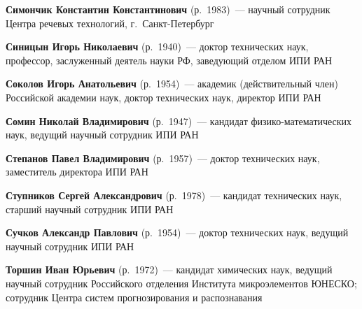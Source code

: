 \begin{multicols}{2}
\vspace*{4pt}

\def\leftfootline{\small{\textbf{\thepage}
\hfill ИНФОРМАТИКА И ЕЁ ПРИМЕНЕНИЯ\ \ \ том~6\ \ \ выпуск~1\ \ \ 2012}
}%
 \def\rightfootline{\small{ИНФОРМАТИКА И ЕЁ ПРИМЕНЕНИЯ\ \ \ том~6\ \ \ выпуск~1\ \ \ 2012
\hfill \textbf{\thepage}}}

\noindent
\textbf{Симончик Константин Константинович} (р.\ 1983)~--- 
научный сотрудник Центра речевых технологий, г.~Санкт-Пе\-тер\-бург

\vspace*{4pt}

\noindent
\textbf{Синицын Игорь Николаевич} (р.\ 1940)~--- доктор технических наук, 
профессор, заслуженный деятель науки РФ, заведующий отделом ИПИ РАН

\vspace*{4pt}


\noindent 
\textbf{Соколов Игорь Анатольевич} (р.\ 1954)~---
академик (действительный член) Российской академии наук,
доктор технических наук, директор ИПИ РАН

\vspace*{4pt}

\noindent
\textbf{Сомин Николай Владимирович} (р.\ 1947)~--- 
кандидат физико-математических наук, ведущий научный сотрудник ИПИ РАН

\vspace*{4pt}

\noindent
\textbf{Степанов Павел Владимирович} (р.\ 1957)~--- 
доктор технических наук, заместитель директора ИПИ РАН
\columnbreak


\noindent
\textbf{Ступников  Сергей Александрович}  (р.\ 1978)~--- 
кандидат технических  наук, старший научный сотрудник ИПИ РАН

\vspace*{6pt}

\noindent
\textbf{Сучков Александр Павлович} (р.\ 1954)~--- 
доктор технических наук, ведущий научный сотрудник ИПИ РАН


\vspace*{6pt}

\noindent
\textbf{Торшин Иван Юрьевич} (р.\ 1972)~--- кандидат химических наук, ведущий научный сотрудник 
Российского отделения Института микроэлементов \mbox{ЮНЕСКО}; 
сотрудник Центра систем прог\-но\-зи\-ро\-вания и распознавания


\vspace*{6pt}


\end{multicols}
